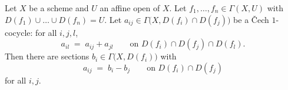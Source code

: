 \begin{theorem}
  \label{pa-thm:affine_open_cech_cobounding}
  \leanok

  Let \(X\) be a scheme and \(U\) an affine open of \(X\). Let \(f_1, \dots, f_n \in
  \Gamma(X, U)\) with \(D(f_1) \cup \dots \cup D(f_n) = U\). Let
  \(a_{ij} \in \Gamma\bigl(X, D(f_i) \cap D(f_j)\bigr)\) be a \v{C}ech \(1\)-cocycle: for all
  \(i, j, l\),
  \[
    a_{il} \;=\; a_{ij} + a_{jl}
    \qquad \text{on } D(f_i) \cap D(f_j) \cap D(f_l).
  \]
  Then there are sections \(b_i \in \Gamma\bigl(X, D(f_i)\bigr)\) with
  \[
    a_{ij} \;=\; b_i - b_j \qquad \text{on } D(f_i) \cap D(f_j)
  \]
  for all \(i, j\).
\end{theorem}
